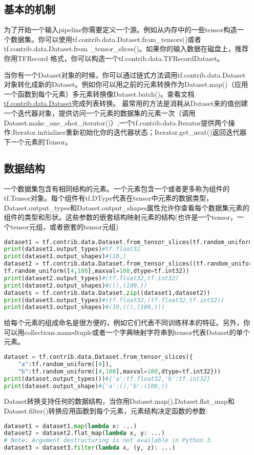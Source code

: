 \subsection{基本的机制}
为了开始一个输入pipeline你需要定义一个源。例如从内存中的一些tensor构造一个数据集。你可以使用tf.contrib.data.Dataset.from\_tensors()或者tf.contrib.data.Dataset.from
\newline \_tensor\_slices()。如果你的输入数据在磁盘上，推荐你用TFRecord
格式，你可以构造一个tf.contrib.data.TFRecordDataset。

当你有一个Dataset对象的时候，你可以通过链式方法调用tf.contrib.data.Dataset对象转化成新的Dataset。例如你可以用之前的元素转换作为Dataset.map()（应用一个函数到每个元素）多元素转换像Dataset.batch()。查看文档\href{https://www.tensorflow.org/api_docs/python/tf/contrib/data/Dataset}{tf.contrib.data.Dataset}完成列表转换。
最常用的方法是消耗从Dataset来的值创建一个迭代器对象，提供访问一个元素的数据集的元素一次（调用Dataset.make\_one\_shot\_iterator()）,一个tf.contrib.data.Iterator提供两个操作:Iterator.initializer重新初始化你的迭代器状态；Iterator.get\_next()返回迭代器下一个元素的Tensor。
\subsection{数据结构}
一个数据集包含有相同结构的元素。一个元素包含一个或者更多称为组件的tf.Tensor对象。每个组件有tf.DType代表在tensor中元素的数据类型，Dataset.output\_types和Dataset.output\_shapes属性允许你查看每个数据集元素的组件的类型和形状。这些参数的嵌套结构映射元素的结构(也许是一个tensor，一个tensor元组，或者嵌套的tensor元组)
\begin{lstlisting}[language=Python]
dataset1 = tf.contrib.data.Dataset.from_tensor_slices(tf.random_uniform([4,10]))
print(dataset1.output_types)#tf.float32
print(dataset1.output_shapes)#(10,)
dataset2 = tf.contrib.data.Dataset.from_tensor_slices((tf.random_uniform([4]))
tf.random_uniform([4,100],maxval=100,dtype=tf.int32))
print(dataset2.output_types)#(tf.float32,tf.int32)
print(dataset2.output_shapes)#((),(100,))
datasets = tf.contrib.data.Dataset.zip((dataset1,dataset2))
print(dataset3.output_types)#(tf.float32,(tf.float32,tf.int32))
print(dataset3.output_shapes)#(10,((),(100,)))
\end{lstlisting}
给每个元素的组成命名是很方便的，例如它们代表不同训练样本的特征。另外，你可以用collections.namedtuple或者一个字典映射字符串到tensor代表Dataset的单个元素。
\begin{lstlisting}[language=Python]
dataset = tf.contrib.data.Dataset.from_tensor_slices({
	"a":tf.random_uniform([4]),
	"b":tf.random_uniform([4,100],maxval=100,dtype=tf.int32}))
print(dataset.output_types())#{'a':tf.float32,'b':tf.int32}
print(dataset.output_shape)#{'a':(),'b':(100,)}
\end{lstlisting}
Dataset转换支持任何的数据结构，当你用Dataset.map(),Dataset.flat\_map和Dataset.filter()转换应用函数到每个元素，元素结构决定函数的参数:
\begin{lstlisting}[language=Python]
dataset1 = dataset1.map(lambda x: ...)
dataset2 = dataset2.flat_map(lambda x, y: ...)
# Note: Argument destructuring is not available in Python 3.
dataset3 = dataset3.filter(lambda x, (y, z): ...)
\end{lstlisting}
